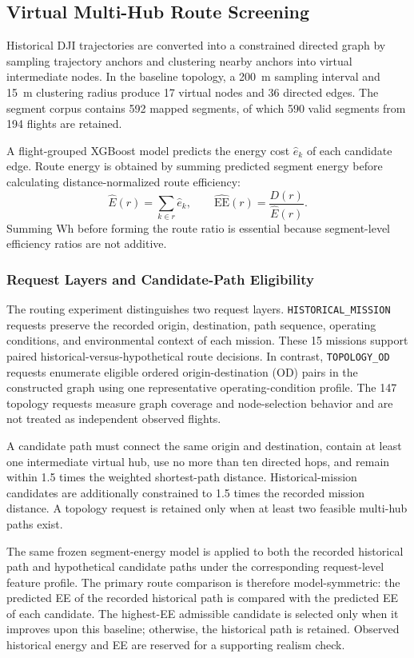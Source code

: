 \documentclass[conference,a4paper]{IEEEtran}
\begin{document}
\subsection{Virtual Multi-Hub Route Screening}
Historical DJI trajectories are converted into a constrained directed graph by sampling trajectory anchors and clustering nearby anchors into virtual intermediate nodes. In the baseline topology, a 200~m sampling interval and 15~m clustering radius produce 17 virtual nodes and 36 directed edges. The segment corpus contains 592 mapped segments, of which 590 valid segments from 194 flights are retained.

A flight-grouped XGBoost model predicts the energy cost $\hat{e}_k$ of each candidate edge. Route energy is obtained by summing predicted segment energy before calculating distance-normalized route efficiency:
\begin{equation}
\widehat{E}(r)=\sum_{k\in r}\hat{e}_k,
\qquad
\widehat{\mathrm{EE}}(r)=\frac{D(r)}{\widehat{E}(r)}.
\end{equation}
Summing Wh before forming the route ratio is essential because segment-level efficiency ratios are not additive.

\subsubsection{Request Layers and Candidate-Path Eligibility}
The routing experiment distinguishes two request layers. \texttt{HISTORICAL\_MISSION} requests preserve the recorded origin, destination, path sequence, operating conditions, and environmental context of each mission. These 15 missions support paired historical-versus-hypothetical route decisions. In contrast, \texttt{TOPOLOGY\_OD} requests enumerate eligible ordered origin-destination (OD) pairs in the constructed graph using one representative operating-condition profile. The 147 topology requests measure graph coverage and node-selection behavior and are not treated as independent observed flights.

A candidate path must connect the same origin and destination, contain at least one intermediate virtual hub, use no more than ten directed hops, and remain within 1.5 times the weighted shortest-path distance. Historical-mission candidates are additionally constrained to 1.5 times the recorded mission distance. A topology request is retained only when at least two feasible multi-hub paths exist.

The same frozen segment-energy model is applied to both the recorded historical path and hypothetical candidate paths under the corresponding request-level feature profile. The primary route comparison is therefore model-symmetric: the predicted EE of the recorded historical path is compared with the predicted EE of each candidate. The highest-EE admissible candidate is selected only when it improves upon this baseline; otherwise, the historical path is retained. Observed historical energy and EE are reserved for a supporting realism check.
\end{document}
